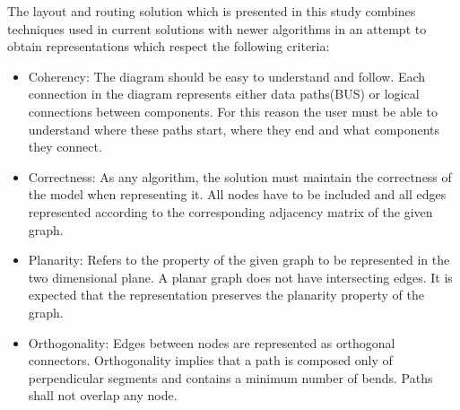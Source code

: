 The layout and routing solution which is presented in this study combines techniques used in current solutions with newer algorithms 
in an attempt to obtain representations which respect the following criteria:

\begin{itemize}

\item Coherency: The diagram should be easy to understand and follow. Each connection in the diagram represents either 
data paths(BUS) or logical connections between components. For this reason the user must be able to understand where these paths start, 
where they end and what components they connect.

\item Correctness: As any algorithm, the solution must maintain the correctness of the model when representing it. All nodes have to be
included and all edges represented according to the corresponding adjacency matrix of the given graph.

\item Planarity: Refers to the property of the given graph to be represented in the two dimensional plane. A planar graph does not have 
intersecting edges. It is expected that the representation preserves the planarity property of the graph.

\item Orthogonality: Edges between nodes are represented as orthogonal connectors. Orthogonality implies that a path is composed only
of perpendicular segments and contains a minimum number of bends. Paths shall not overlap any node.

\end{itemize}
